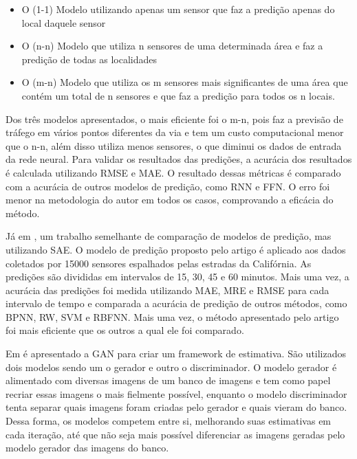 \begin{itemize}
    \item O (1-1) Modelo utilizando apenas um sensor que faz a predição apenas do local daquele sensor
    \item O (n-n) Modelo que utiliza n sensores de uma determinada área e faz a predição de todas as localidades
    \item O (m-n) Modelo que utiliza os m sensores mais significantes de uma área que contém um total de n sensores e que faz a predição para todos os n locais.
\end{itemize}

Dos três modelos apresentados, o mais eficiente foi o m-n, pois faz a previsão de tráfego em vários pontos diferentes da via e tem um custo computacional menor que o n-n, além disso utiliza menos sensores, o que diminui os dados de entrada da rede neural. Para validar os resultados das predições, a acurácia dos resultados é calculada utilizando \acrshort{RMSE} e \acrshort{MAE}. O resultado dessas métricas é comparado com a acurácia de outros modelos de predição, como \acrfull{RNN} e \acrfull{FFN}. O erro foi menor na metodologia do autor em todos os casos, comprovando a eficácia do método. 

Já em \cite{lv_6894591}, um trabalho semelhante de comparação de modelos de predição, mas utilizando \acrfull{SAE}. O modelo de predição proposto pelo artigo é aplicado aos dados coletados por 15000 sensores espalhados pelas estradas da Califórnia. As predições são divididas em intervalos de 15, 30, 45 e 60 minutos. Mais uma vez, a acurácia das predições foi medida utilizando  \acrshort{MAE}, \acrshort{MRE} e \acrshort{RMSE} para cada intervalo de tempo e comparada a acurácia de predição de outros métodos, como \acrfull{BPNN}, \acrfull{RW}, \acrfull{SVM} e \acrfull{RBFNN}. Mais uma vez, o método apresentado pelo artigo foi mais eficiente que os outros a qual ele foi comparado.      

Em \cite{NIPS2014_5423} é apresentado a \acrfull{GAN} para criar um framework de estimativa. São utilizados dois modelos sendo um o gerador e outro o discriminador. O modelo gerador é alimentado com diversas imagens de um banco de imagens e tem como papel recriar essas imagens o mais fielmente possível, enquanto o modelo discriminador tenta separar quais imagens foram criadas pelo gerador e quais vieram do banco. Dessa forma, os modelos competem entre si, melhorando suas estimativas em cada iteração, até que não seja mais possível diferenciar as imagens geradas pelo modelo gerador das imagens do banco.

